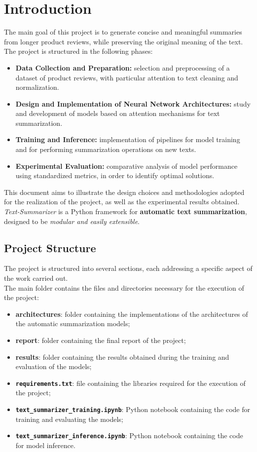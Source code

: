 \section{Introduction}
The main goal of this project is to generate concise and meaningful summaries from longer product reviews, while preserving the original meaning of the text.\\
The project is structured in the following phases:
\begin{itemize}
    \item \textbf{Data Collection and Preparation:} selection and preprocessing of a dataset of product reviews, with particular attention to text cleaning and normalization.
    \item \textbf{Design and Implementation of Neural Network Architectures:} study and development of models based on attention mechanisms for text summarization.
    \item \textbf{Training and Inference:} implementation of pipelines for model training and for performing summarization operations on new texts.
    \item \textbf{Experimental Evaluation:} comparative analysis of model performance using standardized metrics, in order to identify optimal solutions.
\end{itemize}
This document aims to illustrate the design choices and methodologies adopted for the realization of the project, as well as the experimental results obtained.
\textit{Text-Summarizer} is a Python framework for \textbf{automatic text summarization}, designed to be \textit{modular and easily extensible}.

\subsection{Project Structure}
The project is structured into several sections, each addressing a specific aspect of the work carried out.\\
The main folder contains the files and directories necessary for the execution of the project:
\begin{itemize}
    \item \textbf{architectures}: folder containing the implementations of the architectures of the automatic summarization models;
    \item \textbf{report}: folder containing the final report of the project;
    \item \textbf{results}: folder containing the results obtained during the training and evaluation of the models;
    \item \textbf{\texttt{requirements.txt}}: file containing the libraries required for the execution of the project;
    \item \textbf{\texttt{text\_summarizer\_training.ipynb}}: Python notebook containing the code for training and evaluating the models;
    \item \textbf{\texttt{text\_summarizer\_inference.ipynb}}: Python notebook containing the code for model inference.
\end{itemize}

